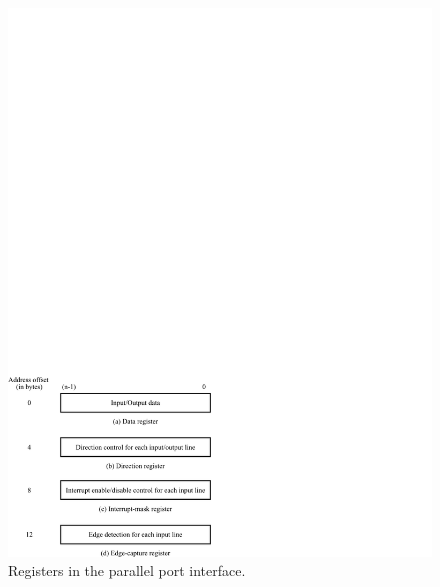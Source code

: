 \documentclass[epsfig,10pt,fullpage]{article}
\begin{document}
\begin{figure}[htb]
	\begin{center}
	\includegraphics[scale=0.90]{figures/figureparallel.pdf}
	\end{center}
	\caption{Registers in the parallel port interface.}
\label{fig:parallel}
\end{figure}
\end{document}
